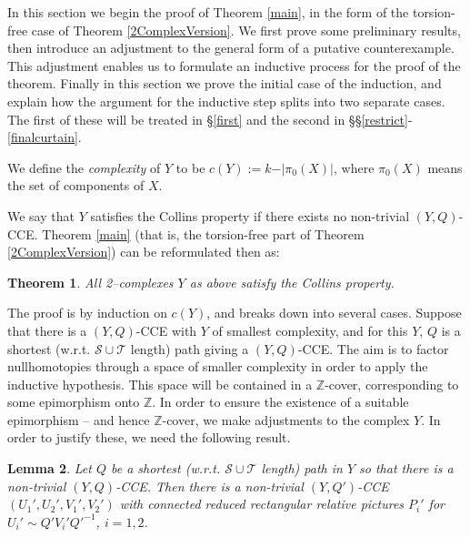 \documentclass[12pt,a4paper]{amsart}
\def\Z{\mathbb{Z}}
\def\cS{\mathcal{S}}
\def\cT{\mathcal{T}}
\newtheorem{thm}{Theorem}[section]
\newtheorem{lem}[thm]{Lemma}
\begin{document}
In this section we begin the proof of Theorem \ref{main}, in the form of the torsion-free case of Theorem \ref{2ComplexVersion}.   We first prove some preliminary results, then introduce an adjustment to the general form of a putative counterexample. This adjustment enables us to formulate an inductive process for the proof of the theorem.   Finally in this section we prove the initial case of the induction,  and explain how the argument for the inductive step splits into two separate cases. The first of these  will be treated in \S \ref{first} and the second in \S\S \ref{restrict}-\ref{finalcurtain}. 


We define the  {\em complexity} of $Y$ to be $c(Y ) := k - \vert\pi_0(X)\vert$, where
$\pi_0(X)$ means the set of components of $X$.

We say that $Y$ satisfies the Collins property if 
there exists no non-trivial $(Y,Q)$-CCE.
Theorem \ref{main} (that is, the torsion-free part of Theorem \ref{2ComplexVersion}) can be reformulated then as:  
\begin{thm}  All 2--complexes  $Y$  as above satisfy the Collins property.
\end{thm}

The proof is by induction on $c(Y)$, and breaks down into several cases. 
Suppose that there is a $(Y,Q)$-CCE with $Y$ of smallest complexity, 
and for this $Y$, $Q$ is a shortest (w.r.t. $\cS\cup\cT$ length) path giving a $(Y,Q)$-CCE. 
The aim is to factor
nullhomotopies through a space of smaller complexity in order to apply
the inductive hypothesis. 
This space will be contained in a $\Z$-cover,
corresponding to some epimorphism onto $\Z$. 
In order to ensure the
existence of a suitable epimorphism – and hence $\Z$-cover, we  make
 adjustments to the complex $Y$. 
In order to justify these, we need the following result.
 
	\begin{lem}\label{Agenerates} 
		Let $Q$ be a shortest (w.r.t. $\cS\cup\cT$ length) path in $Y$ 
		so that there is a non-trivial $(Y,Q)$-CCE.
		Then there is a non-trivial $(Y,Q')$-CCE  $(U_1',U_2',V_1',V_2')$ 
		with connected reduced rectangular relative pictures $P_i'$ for $U_i'\sim Q'V_i'{Q'}^{-1}$, $i=1,2$.
	\end{lem}
	
\end{document}
